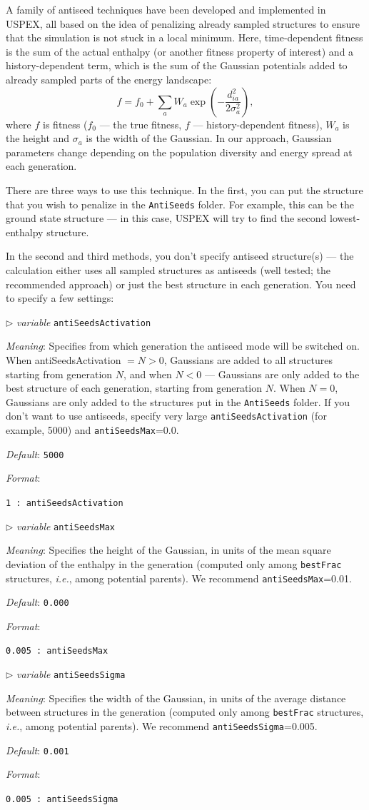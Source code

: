 \documentclass[12pt]{article}
\newcommand{\keyword}[1]{\texttt{#1}}
\newcommand{\file}[1]{\texttt{#1}}
\newcommand{\paramacro}[6]{
\vspace{0.5cm}
$\triangleright$ \emph{variable} {\color{blue} \texttt{#1}}

\emph{Meaning}: {#2}

{#3}

\emph{Default}: \texttt{#4}

\emph{Format}:

{\addtolength{\leftskip}{10mm} 
\texttt{#5}
\par}


{\small #6}

}
\begin{document}
A family of antiseed techniques have been developed and implemented in USPEX,
all based on the idea of penalizing already sampled structures to ensure that
the simulation is not stuck in a local minimum. Here, time-dependent fitness is
the sum of the actual enthalpy (or another fitness property of interest) and a
history-dependent term, which is the sum of the Gaussian potentials added to
already sampled parts of the energy landscape:
\[ f=f_0 + \sum_{a} W_a \exp \left(-\frac{d_{ia}^{2}}{2\sigma_{a}^{2}}\right),
\] where $f$ is fitness ($f_0$ --- the true fitness, $f$ --- history-dependent
fitness), $W_a$ is the height and $\sigma_{a}$ is the width of the Gaussian. In
our approach, Gaussian parameters change depending on the population diversity
and energy spread at each generation.

There are three ways to use this technique. In the first, you can put the
structure that you wish to penalize in the \file{AntiSeeds} folder. For example,
this can be the ground state structure --- in this case, USPEX will try to find
the second lowest-enthalpy structure.

In the second and third methods, you don't specify antiseed structure(s) --- the
calculation either uses all sampled structures as antiseeds (well tested; the
recommended approach) or just the best structure in each generation.
You need to specify a few settings:

\paramacro{antiSeedsActivation}{Specifies from which generation the antiseed
mode will be switched on. When antiSeedsActivation $= N > 0$, Gaussians are
added to all structures starting from generation $N$, and when $N<0$ ---
Gaussians are only added to the best structure of each generation, starting from
generation $N$. When $N=0$, Gaussians are only added to the structures put in
the \file{AntiSeeds} folder. If you don't want to use antiseeds, specify very
large \keyword{antiSeedsActivation} (for example, 5000) and
\keyword{antiSeedsMax}=0.0.}{}{5000}{1 : antiSeedsActivation }{}



\paramacro{antiSeedsMax}{Specifies the height of the Gaussian, in units of the
mean square deviation of the enthalpy in the generation (computed only among
\keyword{bestFrac} structures, \emph{i.e.}, among potential parents). We
recommend \keyword{antiSeedsMax}=0.01.}{}{0.000}{0.005 : antiSeedsMax}{}



\paramacro{antiSeedsSigma}{Specifies the width of the Gaussian, in units of the
average distance between structures in the generation (computed only among
\keyword{bestFrac} structures, \emph{i.e.}, among potential parents). We
recommend \keyword{antiSeedsSigma}=0.005.}{}{0.001}{0.005 : antiSeedsSigma}{}
\end{document}
